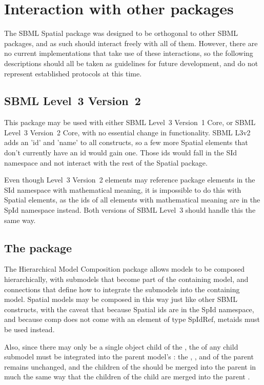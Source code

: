 \section{Interaction with other packages}

The SBML Spatial package was designed to be orthogonal to other SBML packages, and as such should interact freely with all of them.  However, there are no current implementations that take use of these interactions, so the following descriptions should all be taken as guidelines for future development, and do not represent established protocols at this time.

\subsection{SBML Level~3 Version~2}
This package may be used with either SBML Level~3 Version~1 Core, or SBML Level~3 Version~2 Core, with no essential change in functionality.  SBML L3v2 adds an 'id' and 'name' to all constructs, so a few more Spatial elements that don't currently have an id would gain one.  Those ids would fall in the SId namespace and not interact with the rest of the Spatial package.

Even though Level~3 Version~2 elements may reference package elements in the SId namespace with mathematical meaning, it is impossible to do this with Spatial elements, as the ids of all elements with mathematical meaning are in the SpId namespace instead.  Both versions of SBML Level~3 should handle this the same way.


\subsection{The  package}
The Hierarchical Model Composition package allows models to be composed hierarchically, with submodels that become part of the containing model, and connections that define how to integrate the submodels into the containing model.  Spatial models may be composed in this way just like other SBML constructs, with the caveat that because Spatial ids are in the SpId namespace, and because comp does not come with an element of type SpIdRef, metaids must be used instead.

Also, since there may only be a single \Geometry object child of the \Model, the \Geometry of any child submodel must be integrated into the parent model's \Geometry:  the , , and  of the parent remains unchanged, and the children of the \Geometry should be merged into the parent \Geometry in much the same way that the children of the child \Model are merged into the parent \Model.


